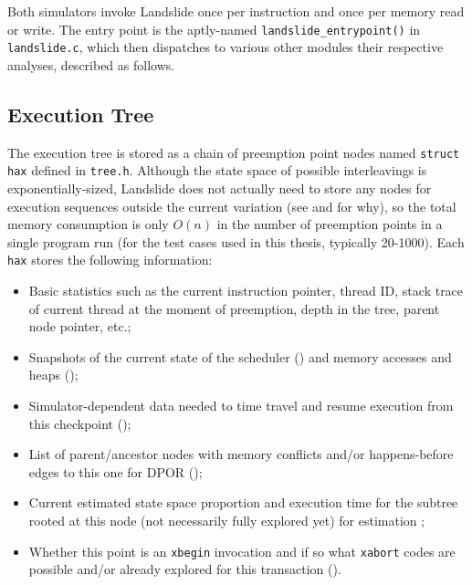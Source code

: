 Both simulators invoke Landslide once per instruction and once per memory read or write.
The entry point is the aptly-named {\tt landslide\_entrypoint()} in {\tt landslide.c},
which then dispatches to various other modules their respective analyses, described as follows.


\subsection{Execution Tree}
\label{sec:landslide-save}

The execution tree
is stored as a chain of preemption point nodes named {\tt struct hax} defined in {\tt tree.h}.
Although the state space of possible interleavings is exponentially-sized,
Landslide does not actually need to store any nodes for execution sequences outside the current variation
(see \sect{\ref{sec:landslide-estimate}} and \sect{\ref{sec:landslide-dpor}} for why),
so the total memory consumption is only $O(n)$ in the number of preemption points in a single program run
(for the test cases used in this thesis, typically 20-1000).
Each {\tt hax} stores the following information:

\begin{itemize}
	\item Basic statistics such as the current instruction pointer, thread ID,
		stack trace of current thread at the moment of preemption,
		depth in the tree, parent node pointer, etc.;
	\item Snapshots of the current state of the scheduler (\sect{\ref{sec:landslide-scheduler}})
		and memory accesses and heaps (\sect{\ref{sec:landslide-memory}});
	\item Simulator-dependent data needed to time travel and resume execution
		from this checkpoint (\sect{\ref{sec:landslide-timetravel}});
	\item List of parent/ancestor nodes with memory conflicts and/or happens-before edges to this one
		for DPOR (\sect{\ref{sec:landslide-dpor}});
	\item Current estimated state space proportion and execution time for the subtree rooted at this node
		(not necessarily fully explored yet) for estimation \sect{\ref{sec:landslide-estimate}};
	\item Whether this point is an {\tt xbegin} invocation
		and if so what {\tt xabort} codes are possible and/or already explored for this transaction
		(\sect{\ref{chap:txn}}).
\end{itemize}

